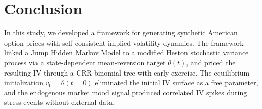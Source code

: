 \section{Conclusion}\label{sec:conclusion}

In this study, we developed a framework for generating synthetic American option prices with self-consistent implied volatility dynamics. The framework linked a Jump Hidden Markov Model to a modified Heston stochastic variance process via a state-dependent mean-reversion target $\theta(t)$, and priced the resulting IV through a CRR binomial tree with early exercise. The equilibrium initialization $v_0 = \theta(t\!=\!0)$ eliminated the initial IV surface as a free parameter, and the endogenous market mood signal produced correlated IV spikes during stress events without external data.

